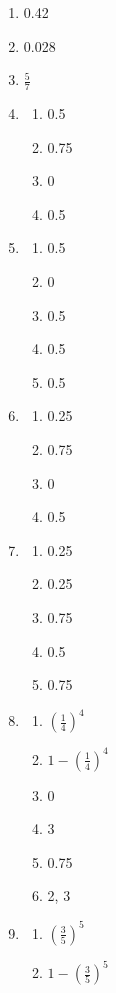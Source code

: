 \begin{enumerate}
	\item 0.42
	\item 0.028
	\item $\frac{5}{7}$
	\item
			\begin{enumerate}
				\item 0.5
				\item 0.75
				\item 0
				\item 0.5
			\end{enumerate}
	\item
			\begin{enumerate}
				\item 0.5
				\item  0
				\item  0.5
				\item  0.5
				\item  0.5
			\end{enumerate}
	\item
			\begin{enumerate}
				\item 0.25
				\item 0.75
				\item 0
				\item 0.5
			\end{enumerate}
	\item
			\begin{enumerate}
				\item 0.25
				\item 0.25
				\item 0.75
				\item 0.5
				\item 0.75
			\end{enumerate}
	\item
			\begin{enumerate}
				\item $\left( \frac{1}{4} \right) ^4$
				\item $1 - \left( \frac{1}{4} \right) ^4$
				\item 0
				\item 3
				\item 0.75
				\item 2, 3
			\end{enumerate}
	\item
			\begin{enumerate}
				\item $\left( \frac{3}{5} \right) ^5$
				\item $1 - \left( \frac{3}{5} \right) ^5$

\end{enumerate}
\end{enumerate}
